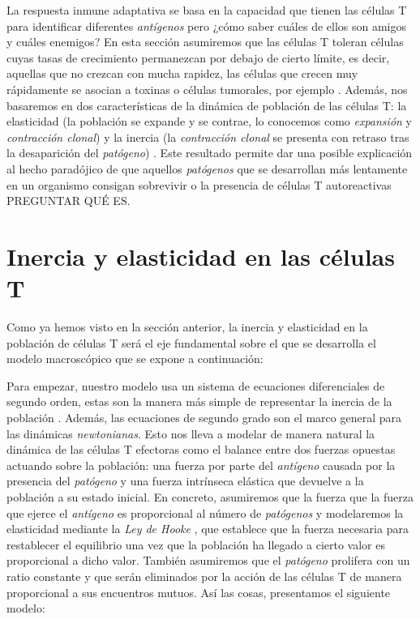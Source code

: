 La respuesta inmune adaptativa se basa en la capacidad que tienen las células T para identificar diferentes \textit{antígenos} pero ¿cómo saber cuáles de ellos son amigos y cuáles enemigos? En esta sección asumiremos que las células T toleran células cuyas tasas de crecimiento permanezcan por debajo de cierto límite, es decir, aquellas que no crezcan con mucha rapidez, las células que crecen muy rápidamente se asocian a toxinas o células tumorales, por ejemplo \citep{arias2015growth}. Además, nos basaremos en dos características de la dinámica de población de las células T: la elasticidad (la población se expande y se contrae, lo conocemos como \textit{expansión} y \textit{contracción clonal}) y la inercia (la \textit{contracción clonal} se presenta con retraso tras la desaparición del \textit{patógeno}) \citep{arias2015growth}. Este resultado permite dar una posible explicación al hecho paradójico de que aquellos \textit{patógenos} que se desarrollan más lentamente en un organismo consigan sobrevivir o la presencia de células T autoreactivas PREGUNTAR QUÉ ES.


\section{Inercia y elasticidad en las células T}

Como ya hemos visto en la sección anterior, la inercia y elasticidad en la población de células T será el eje fundamental sobre el que se desarrolla el modelo macroscópico que se expone a continuación: 

Para empezar, nuestro modelo usa un sistema de ecuaciones diferenciales de segundo orden, estas son la manera más simple de representar la inercia de la población \citep{arias2015growth}. Además, las ecuaciones de segundo grado son el marco general para las dinámicas \textit{newtonianas}. Esto nos lleva a modelar de manera natural la dinámica de las células T efectoras como el balance entre dos fuerzas opuestas actuando sobre la población: una fuerza por parte del \textit{antígeno} causada por la presencia del \textit{patógeno} y una fuerza intrínseca elástica que devuelve a la población a su estado inicial. En concreto, asumiremos que la fuerza que la fuerza que ejerce el \textit{antígeno} es proporcional al número de \textit{patógenos} y modelaremos la elasticidad mediante la \textit{Ley de Hooke} \citep{arias2015growth}, que establece que la fuerza necesaria para restablecer el equilibrio una vez que la población ha llegado a cierto valor es proporcional a dicho valor. También asumiremos que el \textit{patógeno} prolifera con un ratio constante y que serán eliminados por la acción de las células T de manera proporcional a sus encuentros mutuos. Así las cosas, presentamos el siguiente modelo:

